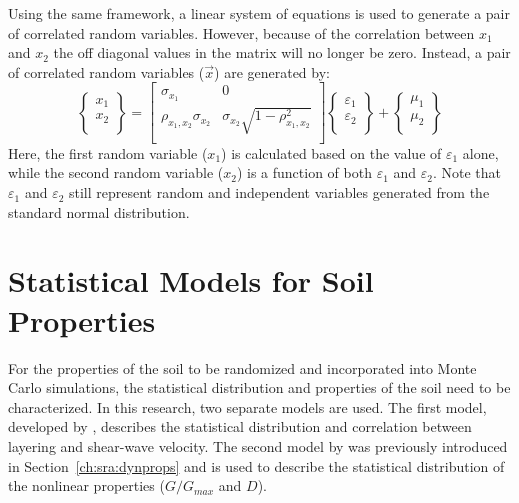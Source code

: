 \documentclass[12pt,oneside]{book}
\begin{document}
Using the same framework, a linear system of equations is used to generate a pair of correlated
random variables.  However, because of the correlation between $x_1$ and $x_2$ the off diagonal
values in the matrix will no longer be zero.  Instead, a pair of correlated random variables
($\vec{x}$) are generated by:
\begin{equation}
    \left\{
        \begin{array}{c}
            x_1 \\
            x_2 \\
        \end{array}
    \right\}
    =
    \left[
        \begin{array}{cc}
            \sigma_{x_1} & 0 \\
            \rho_{x_1,x_2}\sigma_{x_2} & \sigma_{x_2} \sqrt{1 - \rho_{x_1,x_2}^2} \\
        \end{array}
    \right]
    \left\{
        \begin{array}{c}
            \varepsilon_1 \\
            \varepsilon_2 \\
        \end{array}
    \right\}
    +
    \left\{
        \begin{array}{c}
            \mu_1 \\
            \mu_2 \\
        \end{array}
    \right\}
    \label{eq:linearSystem:correlSol}
\end{equation} %
Here, the first random variable ($x_1$) is calculated based on the value of $\varepsilon_1$ alone,
while the second random variable ($x_2$) is a function of both $\varepsilon_1$ and $\varepsilon_2$.
Note that $\varepsilon_1$ and $\varepsilon_2$ still represent random and independent variables
generated from the standard normal distribution.

\section{Statistical Models for Soil Properties}
For the properties of the soil to be randomized and incorporated into Monte Carlo simulations, the
statistical distribution and properties of the soil need to be characterized.  In this research, two
separate models are used.  The first model, developed by \citet{toro:95}, describes the statistical
distribution and correlation between layering and shear-wave velocity.  The second model by
\citet{darendeli:01} was previously introduced in Section~\ref{ch:sra:dynprops} and is used to
describe the statistical distribution of the nonlinear properties ($G/G_{max}$ and $D$).
\end{document}
